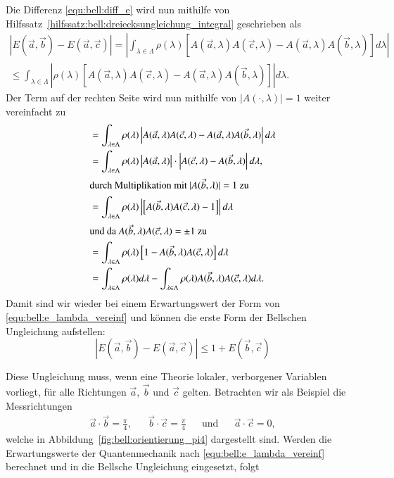 \begin{refsection}
Die Differenz \eqref{equ:bell:diff_e} wird nun mithilfe von
Hilfssatz~\ref{hilfssatz:bell:dreiecksungleichung_integral} geschrieben als
\begin{equation}
\begin{split}
    |E(\vec{a},\vec{b}) - E(\vec{a},\vec{c})| =
    \left| \int_{\lambda\in\Lambda} \rho(\lambda) \left[
         A(\vec{a},\lambda)A(\vec{c},\lambda) - 
         A(\vec{a},\lambda)A(\vec{b},\lambda) \right]
        d\lambda
    \right| \\
    \leq 
    \int_{\lambda\in\Lambda} \left|  
        \rho(\lambda)\left[
         A(\vec{a},\lambda)A(\vec{c},\lambda) - 
         A(\vec{a},\lambda)A(\vec{b},\lambda)
    \right]
    \right| d\lambda.
\end{split}
\end{equation}
Der Term auf der rechten Seite wird nun mithilfe von $|A(\cdot,\lambda)|=1$
weiter vereinfacht zu
\begin{align*}
    &= \int_{\lambda\in\Lambda} \rho(\lambda) \left|
    A(\vec{a},\lambda)A(\vec{c},\lambda) - A(\vec{a},\lambda)A(\vec{b},\lambda)
    \right| d\lambda \\
    &= \int_{\lambda\in\Lambda} \rho(\lambda)
    \left| A(\vec{a},\lambda) \right| \cdot 
    \left| A(\vec{c},\lambda) - A(\vec{b},\lambda) \right| d\lambda, \\
    \intertext{durch Multiplikation mit $|A(\vec{b},\lambda)|=1$ zu}
    &= \int_{\lambda\in\Lambda} \rho(\lambda)
    \left|\left[ A(\vec{b},\lambda) A(\vec{c},\lambda) - 1 \right]\right| d\lambda \\
    \intertext{und da $A(\vec{b},\lambda)A(\vec{c},\lambda) = \pm 1$ zu}
    &= \int_{\lambda\in\Lambda} \rho(\lambda) 
    \left[1 - A(\vec{b},\lambda)A(\vec{c},\lambda) \right] d\lambda \\
    &= \int_{\lambda\in\Lambda} \rho(\lambda) d\lambda
    - \int_{\lambda\in\Lambda} \rho(\lambda) 
    A(\vec{b},\lambda)A(\vec{c},\lambda) d\lambda.
\end{align*}
Damit sind wir wieder bei einem Erwartungswert der Form von
\eqref{equ:bell:e_lambda_vereinf} und k\"onnen die erste Form der Bellschen
Ungleichung \cite[(15)]{Bell:Bell1964} aufstellen:
\begin{equation}\label{equ:bell:bellsche_ungleichung}
    \left| E(\vec{a},\vec{b}) - E(\vec{a},\vec{c}) \right| 
    \leq
    1 + E(\vec{b},\vec{c})
\end{equation}

Diese Ungleichung muss, wenn eine Theorie lokaler, verborgener Variablen 
vorliegt, f\"ur alle Richtungen $\vec{a}$, $\vec{b}$ und $\vec{c}$ gelten.
Betrachten wir als Beispiel die Messrichtungen
\begin{align*}
    \vec{a}\cdot\vec{b} = \frac{\pi}{4}, &&
    \vec{b}\cdot\vec{c} = \frac{\pi}{4} &&
    \text{und} &&
    \vec{a}\cdot\vec{c} = 0,
\end{align*}
welche in Abbildung~\ref{fig:bell:orientierung_pi4} dargestellt sind.
Werden die Erwartungswerte der Quantenmechanik nach 
\eqref{equ:bell:e_lambda_vereinf} berechnet und in die Bellsche Ungleichung
eingesetzt, folgt


\end{refsection}

